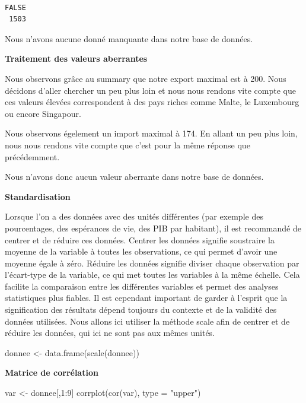 \documentclass[
]{article}
\newenvironment{Shaded}{}{}
\newcommand{\AttributeTok}[1]{#1}
\newcommand{\DecValTok}[1]{#1}
\newcommand{\FunctionTok}[1]{#1}
\newcommand{\NormalTok}[1]{#1}
\newcommand{\OtherTok}[1]{\textcolor[rgb]{1.00,0.25,0.00}{#1}}
\newcommand{\SpecialCharTok}[1]{\textcolor[rgb]{0.00,0.50,0.50}{#1}}
\newcommand{\StringTok}[1]{\textcolor[rgb]{0.00,0.50,0.50}{#1}}
\begin{document}
\begin{verbatim}

FALSE 
 1503 
\end{verbatim}

Nous n'avons aucune donné manquante dans notre base de données.

\textbf{Traitement des valeurs aberrantes}

Nous observons grâce au summary que notre export maximal est à 200. Nous
décidons d'aller chercher un peu plus loin et nous nous rendons vite
compte que ces valeurs élevées correspondent à des pays riches comme
Malte, le Luxembourg ou encore Singapour.

Nous observons égelement un import maximal à 174. En allant un peu plus
loin, nous nous rendons vite compte que c'est pour la même réponse que
précédemment.

Nous n'avons donc aucun valeur aberrante dans notre base de données.

\textbf{Standardisation}

Lorsque l'on a des données avec des unités différentes (par exemple des
pourcentages, des espérances de vie, des PIB par habitant), il est
recommandé de centrer et de réduire ces données. Centrer les données
signifie soustraire la moyenne de la variable à toutes les observations,
ce qui permet d'avoir une moyenne égale à zéro. Réduire les données
signifie diviser chaque observation par l'écart-type de la variable, ce
qui met toutes les variables à la même échelle. Cela facilite la
comparaison entre les différentes variables et permet des analyses
statistiques plus fiables. Il est cependant important de garder à
l'esprit que la signification des résultats dépend toujours du contexte
et de la validité des données utilisées. Nous allons ici utiliser la
méthode scale afin de centrer et de réduire les données, qui ici ne sont
pas aux mêmes unités.

\begin{Shaded}
\begin{Highlighting}[]
\NormalTok{donnee }\OtherTok{\textless{}{-}} \FunctionTok{data.frame}\NormalTok{(}\FunctionTok{scale}\NormalTok{(donnee))}
\end{Highlighting}
\end{Shaded}

\textbf{Matrice de corrélation}

\begin{Shaded}
\begin{Highlighting}[]
\NormalTok{var }\OtherTok{\textless{}{-}}\NormalTok{ donnee[,}\DecValTok{1}\SpecialCharTok{:}\DecValTok{9}\NormalTok{]}
\FunctionTok{corrplot}\NormalTok{(}\FunctionTok{cor}\NormalTok{(var), }\AttributeTok{type =} \StringTok{"upper"}\NormalTok{)}
\end{Highlighting}
\end{Shaded}
\end{document}
